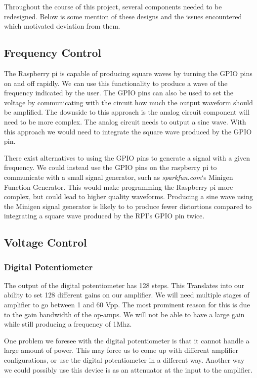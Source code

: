 \documentclass{article}	%
\begin{document}
\begin{multicols}{2}
Throughout the course of this project,
several components needed to be redesigned.
Below is some mention of these designs and
the issues encountered which motivated deviation from them.

\subsection{Frequency Control}
The Raspberry pi is capable of producing square waves by turning the GPIO pins on and off rapidly. We can use this functionality to produce a wave of the frequency indicated by the user. The GPIO pins can also be used to set the voltage by communicating with the circuit how much the output waveform should be amplified. The downside to this approach is the analog circuit component will need to be more complex. The analog circuit needs to output a sine wave. With this approach we would need to integrate the square wave produced by the GPIO pin.

There exist alternatives to using the GPIO pins to generate a signal with a given frequency. We could instead use the GPIO pins on the raspberry pi to communicate with a small signal generator, such as \textit{sparkfun.com}‘s Minigen Function Generator. This would make programming the Raspberry pi more complex, but could lead to higher quality waveforms. Producing a sine wave using the Minigen signal generator is likely to to produce fewer distortions compared to integrating a square wave produced by the RPI’s GPIO pin twice. 

\subsection{Voltage Control}
\subsubsection{Digital Potentiometer}
The output of the digital potentiometer has 128 steps. This Translates into our ability to set 128 different gains on our amplifier. We will need multiple stages of amplifier to go between 1 and 60 Vpp. The most prominent reason for this is due to the gain bandwidth of the op-amps. We will not be able to have a large gain while still producing a frequency of 1Mhz.

One problem we foresee with the digital potentiometer is that it cannot handle a large amount of power. This may force us to come up with different amplifier configurations, or use the digital potentiometer in a different way. Another way we could possibly use this device is as an attenuator at the input to the amplifier.


\end{multicols}
\end{document}
